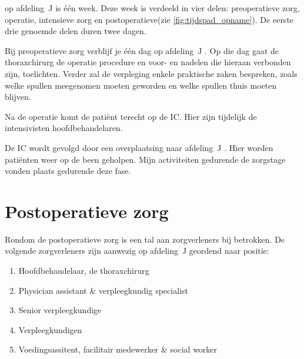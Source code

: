 \documentclass[nohyper,nobib]{tufte-book} %
\newcommand{\afdelingj}{afdeling~J }
\begin{document}
     op \afdelingj is één week. Deze week is verdeeld in vier delen: preoperatieve zorg, operatie, intensieve zorg en postoperatieve(zie \cref{fig:tijdspad_opname}). De eerste drie genoemde delen duren twee dagen. 
\begin{marginfigure}
    \caption{Tijdspad van opname in hartcentrum \& \afdelingj tot aan ontslag.}
    \label{fig:tijdspad_opname}
\end{marginfigure}
Bij preoperatieve zorg verblijf je één dag op \afdelingj. Op die dag gaat de thoraxchirurg de operatie procedure en voor- en nadelen die hieraan verbonden zijn, toelichten. Verder zal de verpleging enkele praktische zaken bespreken, zoals welke spullen meegenomen moeten geworden en welke spullen thuis moeten blijven.

Na de operatie komt de patiënt terecht op de IC. Hier zijn tijdelijk de intensivisten hoofdbehandelaren.

De IC wordt gevolgd door een overplaatsing naar \afdelingj. Hier worden patiënten weer op de been geholpen. Mijn activiteiten gedurende de zorgstage vonden plaats gedurende deze fase. 
\chapter{Postoperatieve zorg}
Rondom de postoperatieve zorg is een tal aan zorgverleners bij betrokken. De volgende zorgverleners zijn aanwezig op \afdelingj geordend naar positie:
    \begin{enumerate}
        \item Hoofdbehandelaar, de thoraxchirurg
        \item Physician assistant \& verpleegkundig specialist
        \item Senior verpleegkundige
        \item Verpleegkundigen
        \item Voedingsassitent, facilitair medewerker \& social worker
    \end{enumerate}
\end{document}
